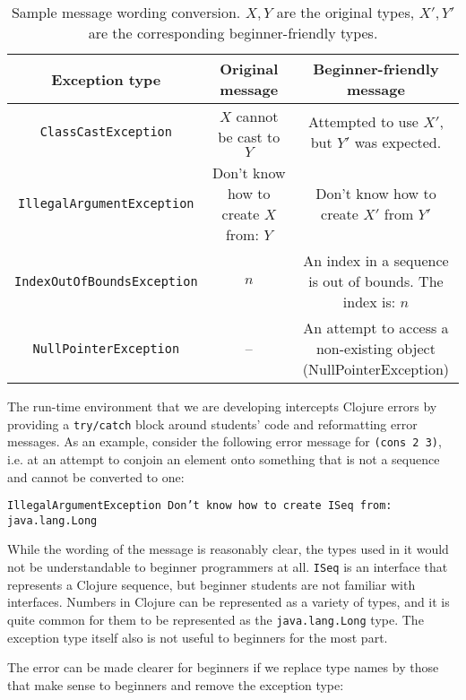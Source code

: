 \documentclass[submission,copyright,creativecommons]{eptcs}
\newcommand{\allcomments}[1]{{#1}}
\newcommand{\elenacomment}[1]{{\bf \textcolor{ForestGreen}{\allcomments{{#1}}}}}
\begin{document}
 \begin{table}
\begin{tabular}{|c|c|c|}
\hline
Exception type & Original message & Beginner-friendly message \\
\hline 
{\tt ClassCastException} & $X$ cannot be cast to $Y$ & {\parbox{5cm}{Attempted to use $X'$, \\ 
but $Y'$ was expected.}} \\[0.3cm]
\hline
{\tt IllegalArgumentException} & 
Don't know how to create $X$ from:  $Y$ & 
{\parbox{5cm}{Don't know how to \\ create  $X'$ from $Y'$}} \\[0.3cm]
\hline
{\tt IndexOutOfBoundsException} & $n$ & {\parbox{5cm}{An index in a sequence \\ 
is out of bounds. The index is: $n$}} \\[0.3cm]
\hline
{\tt NullPointerException} & -- &  {\parbox{5cm}{An attempt to access a 
\\ non-existing object
\\ (NullPointerException)}} \\[0.3cm]
\hline
\end{tabular}
\caption{Sample message wording conversion. $X,Y$ are the original types, $X',Y'$ are the corresponding beginner-friendly types. }\label{table:messages}
\end{table}
The run-time environment that we are developing intercepts Clojure errors by providing a {\tt try/catch} block around students' code and reformatting error messages. 
As an example, consider the following error message for {\tt (cons 2 3)}, i.e. at an attempt to conjoin an element onto something that is not a sequence and cannot be converted to one:

{\tt IllegalArgumentException Don't know how to create ISeq from: java.lang.Long}

While the wording of the message is reasonably clear, the types used in it would not be understandable to beginner programmers at all. {\tt ISeq} is an interface that represents a Clojure sequence, but beginner students are not familiar with interfaces. Numbers in Clojure can be represented as a variety of types, and it is quite common for them to be represented as the {\tt  java.lang.Long} type. The exception type itself also is not useful to beginners for the most part. 

The error can be made clearer for beginners if we replace type names by those that make sense to beginners and remove the exception type:
\end{document}
